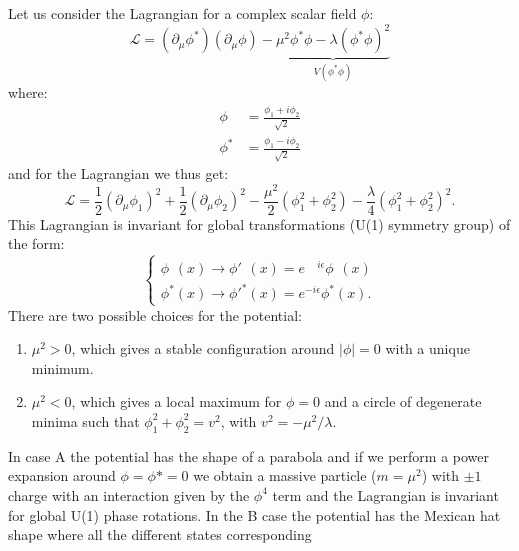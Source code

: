 Let us consider the Lagrangian for a complex scalar field $\phi$:
\begin{equation}
  \label{eq:25}
  \mathcal{L} = (\partial_{\mu} \phi^{*})(\partial_{\mu} \phi) -
  \underbrace{\mu^{2}\phi^{*}\phi - \lambda(\phi^{*}\phi)^{2}}_{V(\phi^{*}\phi)}
\end{equation}
where:
\begin{equation}
  \label{eq:26}
  \begin{split}
    \phi^{\phantom{*}} &= \frac{\phi_{1} + i \phi_{2}}{\sqrt{2}} \\
    \phi^{*} &= \frac{\phi_{1} - i \phi_{2}}{\sqrt{2}}
  \end{split}
\end{equation}
and for the Lagrangian we thus get:
\begin{equation}
  \label{eq:27}
  \mathcal{L} = \frac{1}{2} (\partial_{\mu} \phi_{1})^{2} +
  \frac{1}{2} ( \partial_{\mu} \phi_{2} )^{2} - \frac{\mu^{2}}{2} (
  \phi_{1}^{2} + \phi_{2}^{2} ) - \frac{\lambda}{4} ( \phi_{1}^{2} +
  \phi_{2}^{2} )^{2}.
\end{equation}
This Lagrangian is invariant for global transformations (U(1) symmetry group) of
the form:
\begin{equation}
  \label{eq:28}
  \begin{cases}
    \phi^{\phantom{*}}(x) \rightarrow {\phi'}^{\phantom{*}}(x) = e^{\phantom{-} i
      \epsilon}
    \phi^{\phantom{*}}(x) \\
    \phi^{*} (x) \rightarrow {\phi'}^{*} (x) = e^{- i \epsilon} \phi^{*}(x).
  \end{cases}
\end{equation}
There are two possible choices for the potential:
\begin{enumerate}[A -]
\item $\mu^{2} > 0$, which gives a stable configuration around $|\phi| = 0$ with
  a unique minimum.
\item $\mu^{2} < 0$, which gives a local maximum for $\phi = 0$ and a circle of
  degenerate minima such that $\phi_{1}^{2} + \phi_{2}^{2} = v^{2}$, with
  $v^{2} = - \mu^{2} / \lambda$.
\end{enumerate}
In case A the potential has the shape of a parabola and if we perform a power
expansion around $\phi = \phi* = 0$ we obtain a massive particle ($m = \mu^2$)
with $\pm 1$ charge with an interaction given by the $\phi^4$ term and the
Lagrangian is invariant for global U(1) phase rotations. In the B case the
potential has the Mexican hat shape where all the different states corresponding
